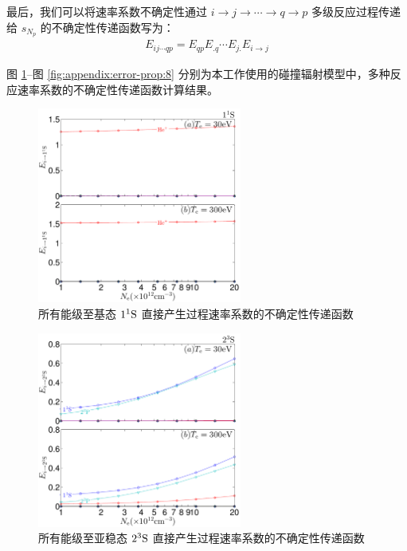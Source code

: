 最后，我们可以将速率系数不确定性通过 $i\to j\to\cdots\to q\to p$ 多级反应过程传递给 $s_{N_p}$ 的不确定性传递函数写为：
\begin{eqnarray}
E_{ij\cdots qp}=E_{qp}E_{.q}\cdots E_{j.}E_{i\to j}
\label{eq:appendix:error:MPDcoefficient}
\end{eqnarray}

图 \ref{fig:appendix:error-prop:1}--图 \ref{fig:appendix:error-prop:8} 分别为本工作使用的碰撞辐射模型中，多种反应速率系数的不确定性传递函数计算结果。

\begin{figure}%
    \centering
    \includegraphics[width=0.6\textwidth]{11S-error-propagation-coefficient.pdf}
    \caption{所有能级至基态 $1^1{\rm S}$ 直接产生过程速率系数的不确定性传递函数}
    \label{fig:appendix:error-prop:1}
\end{figure}

\begin{figure}%
    \centering
    \includegraphics[width=0.6\textwidth]{23S-error-propagation-coefficient.pdf}
    \caption{所有能级至亚稳态 $2^3{\rm S}$ 直接产生过程速率系数的不确定性传递函数}
    \label{fig:appendix:error-prop:2}
\end{figure}

